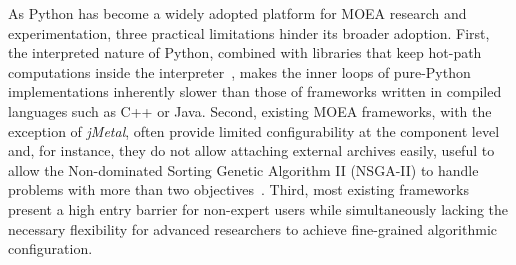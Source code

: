 \documentclass[final,5p,times,twocolumn]{elsarticle}
\begin{document}
As Python has become a widely adopted platform for MOEA research and experimentation, three practical limitations hinder its broader adoption. First, the interpreted nature of Python, combined with libraries that keep hot-path computations inside the interpreter~\cite{BNG+19,FDG+12,hadka15}, makes the inner loops of pure-Python implementations inherently slower than those of frameworks written in compiled languages such as C++ or Java. Second, existing MOEA frameworks, with the exception of \textit{jMetal}, often provide limited configurability at the component level and, for instance, they do not allow attaching external archives easily, useful to allow the Non-dominated Sorting Genetic Algorithm II (NSGA-II) to handle problems with more than two objectives~\cite{IPS20}. Third, most existing frameworks present a high entry barrier for non-expert users while simultaneously lacking the necessary flexibility for advanced researchers to achieve fine-grained algorithmic configuration.
\end{document}

